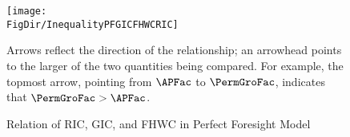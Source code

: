 \begin{figure}[ht]
  \label{fig:InequalityPFGICFHWCRIC}
  \centerline{
    \texttt{[image: \\FigDir/InequalityPFGICFHWCRIC]}
  }
  \caption{Relation of {RIC}, {GIC}, and {FHWC} in Perfect Foresight Model}
  \footnotesize{Arrows reflect the direction of the relationship; an arrowhead points to the larger of the two quantities being compared.  For example, the topmost arrow, pointing from $\APFac$ to $\PermGroFac$, indicates that $\PermGroFac > \APFac$.}
\end{figure}
